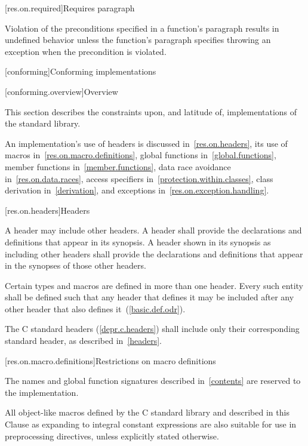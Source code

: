 [res.on.required]{Requires paragraph}

\pnum
{}%
Violation of the preconditions specified in a function's
\requires
paragraph results in undefined behavior unless the function's
\throws
paragraph specifies throwing an exception when the precondition is violated.

[conforming]{Conforming implementations}

[conforming.overview]{Overview}

\pnum
This section describes the constraints upon, and latitude of, implementations of the \Cpp standard library.

\pnum
An implementation's use of headers is discussed in~\ref{res.on.headers}, its use
of macros in~\ref{res.on.macro.definitions}, global functions
in~\ref{global.functions}, member functions in~\ref{member.functions}, data race
avoidance in~\ref{res.on.data.races}, access specifiers
in~\ref{protection.within.classes}, class derivation in~\ref{derivation}, and
exceptions in~\ref{res.on.exception.handling}.

[res.on.headers]{Headers}

\pnum
A \Cpp header may include other \Cpp headers.
A \Cpp header shall provide the declarations and definitions that appear in its
synopsis. A \Cpp header shown in its synopsis as including other \Cpp headers
shall provide the declarations and definitions that appear in the synopses of
those other headers.

\pnum
Certain types and macros are defined in more than one header.
Every such entity shall be defined such that any header that defines it may be
included after any other header that also defines it~(\ref{basic.def.odr}).

\pnum
The C standard headers (\ref{depr.c.headers})
shall include only their corresponding \Cpp standard header, as described in~\ref{headers}.

[res.on.macro.definitions]{Restrictions on macro definitions}
%

\pnum
The names and global function signatures described in~\ref{contents} are
%
reserved to the implementation.
%
%
%
%
%

\pnum
All object-like macros defined by the C standard library and described in this
Clause as expanding to integral constant expressions are also suitable for use
in  preprocessing directives, unless
explicitly stated otherwise.

